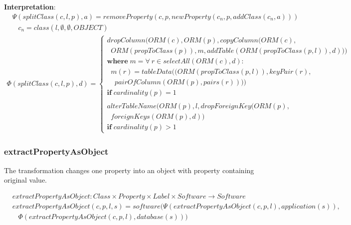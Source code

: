 \documentclass[10pt]{article}
\begin{document}
\noindent \textbf{Interpretation}:
\begin{align}
& \Psi(splitClass(c, l, p), a) =
removeProperty(c, p, newProperty(c_n, p,  addClass(c_n, a))) \nonumber \\
& \;\;\; c_n = class(l, \emptyset, \emptyset, OBJECT)
\end{align}
\begin{align}
\Phi(splitClass(c, l, p), d) = \begin{cases}
dropColumn(ORM(c), ORM(p), copyColumn(ORM(c), \\  \;\; ORM(propToClass(p)), m, addTable(ORM(propToClass(p, l)), d)))\\
\mathbf{where} \; m = \forall \: r \in selectAll(ORM(c), d) : \\  \;\; m(r) = tableData((ORM(propToClass(p, l)), keyPair(r), \\  \;\;\;\; pairOfColumn(ORM(p), pairs(r)))) \\ 
  \mathbf{if} \; cardinality(p) = 1   \\\\
alterTableName(ORM(p), l, dropForeignKey(ORM(p), \\ \;\; foreignKeys(ORM(p), d)) \\ 
  \mathbf{if} \; cardinality(p) > 1  
 \end{cases}
\end{align}

\subsubsection{extractPropertyAsObject}
The transformation changes one property into an object with property containing original value.

\begin{align}
& extractPropertyAsObject: Class \times Property \times Label \times Software \rightarrow Software \nonumber \\
& extractPropertyAsObject(c, p, l, s) = 
 software(\Psi(extractPropertyAsObject(c, p, l), application(s)), \nonumber \\
 & \;\;\; \Phi(extractPropertyAsObject(c, p, l), database(s)))
\end{align}
\end{document}
